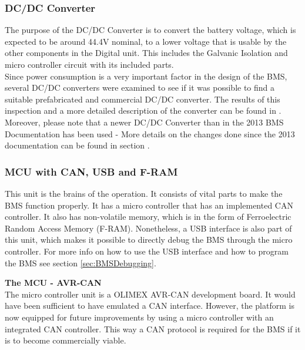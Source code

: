 \subsubsection{DC/DC Converter}
The purpose of the DC/DC Converter is to convert the battery voltage, which is expected to be around 44.4V nominal, to a lower voltage that is usable by the other components in the Digital unit. This includes the Galvanic Isolation and micro controller circuit with its included parts. \\
Since power consumption is a very important factor in the design of the BMS, several DC/DC converters were examined to see if it was possible to find a suitable prefabricated and commercial DC/DC converter. The results of this inspection and a more detailed description of the converter can be found in . Moreover, please note that a newer DC/DC Converter than in the 2013 BMS Documentation has been used - More details on the changes done since the 2013 documentation can be found in section .  

\subsubsection{MCU with CAN, USB and F-RAM}
This unit is the brains of the operation. It consists of vital parts to make the BMS function properly. It has a micro controller that has an implemented CAN controller. It also has non-volatile memory, which is in the form of Ferroelectric Random Access Memory (F-RAM). Nonetheless, a USB interface is also part of this unit, which makes it possible to directly debug the BMS through the micro controller. For more info on how to use the USB interface and how to program the BMS see section \ref{sec:BMSDebugging}.

\textbf{The MCU - AVR-CAN}\\
The micro controller unit is a OLIMEX AVR-CAN development board. It would have been sufficient to have emulated a CAN interface. However, the platform is now equipped for future improvements by using a micro controller with an integrated CAN controller. This way a CAN protocol is required for the BMS if it is to become commercially viable.


